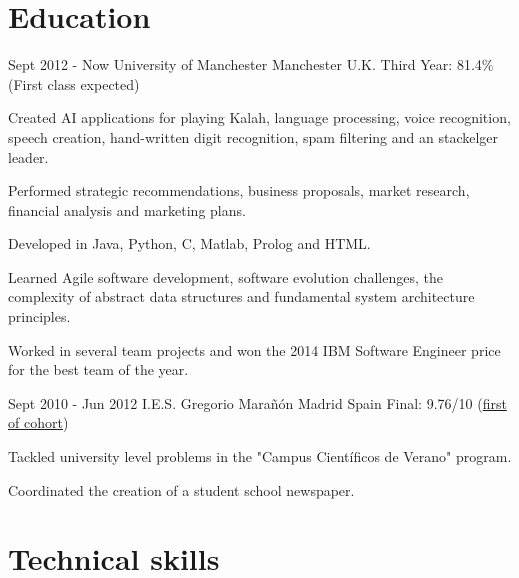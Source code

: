 \documentclass[10pt]{CurriculumVitae}
\begin{document}
  \section{Education}
   
      {Sept 2012 - Now}
      {University of Manchester}
      {Manchester}
      {U.K.}
      {Third Year: 81.4\% (First class expected)}
      {
         \item Created AI applications for playing Kalah, language processing, voice recognition, speech creation, 
         hand-written digit recognition, spam filtering and an stackelger leader.
         \item Performed strategic recommendations, business proposals, market research, financial analysis and marketing plans.
         \item Developed in Java, Python, C, Matlab, Prolog and HTML.
         \item Learned Agile software development, software evolution challenges, the complexity of abstract data structures and
          fundamental system architecture principles. 
         \item Worked in several team projects and won the 2014 IBM Software Engineer price for the best team of the year.
      }

      {Sept 2010 - Jun 2012}
      {I.E.S. Gregorio Marañón}
      {Madrid}
      {Spain}
      {Final: 9.76/10 (\underline{first of cohort})}
      {
         \item Tackled university level problems in the "Campus Científicos de Verano" program.
         \item Coordinated the creation of a student school newspaper.
      }


  \section{Technical skills}
    
\end{document}
